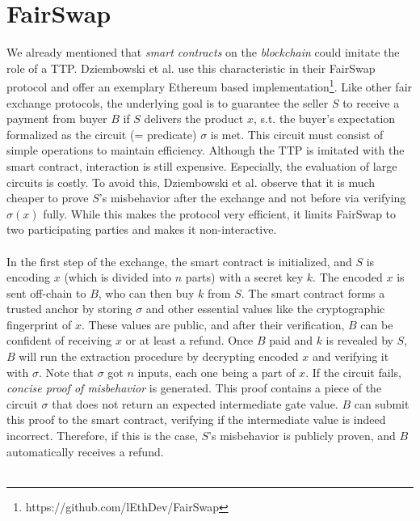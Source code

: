 \documentclass{cacthesis}
\newcounter{protocol}
\begin{document}
        \section{FairSwap}
        \label{sec:FairSwap}
        We already mentioned that \textit{smart contracts} on the \textit{blockchain} could imitate the role of a TTP. Dziembowski et al. use this characteristic in their FairSwap protocol \cite{10.1145/3243734.3243857} and offer an exemplary Ethereum based implementation\footnote{https://github.com/lEthDev/FairSwap}. Like other fair exchange protocols, the underlying goal is to guarantee the seller $S$ to receive a payment from buyer $B$ if $S$ delivers the product $x$, s.t. the buyer's expectation formalized as the circuit (= predicate) $\sigma$ is met. This circuit must consist of simple operations to maintain efficiency. Although the TTP is imitated with the smart contract, interaction is still expensive. Especially, the evaluation of large circuits is costly. To avoid this, Dziembowski et al. observe that it is much cheaper to prove $S$'s misbehavior after the exchange and not before via verifying $\sigma(x)$ fully. While this makes the protocol very efficient, it limits FairSwap to two participating parties and makes it non-interactive. \\\\
        In the first step of the exchange, the smart contract is initialized, and $S$ is encoding $x$ (which is divided into $n$ parts) with a secret key $k$. The encoded $x$ is sent off-chain to $B$, who can then buy $k$ from $S$. The smart contract forms a trusted anchor by storing $\sigma$ and other essential values like the cryptographic fingerprint of $x$. These values are public, and after their verification, $B$ can be confident of receiving $x$ or at least a refund. Once $B$ paid and $k$ is revealed by $S$, $B$ will run the extraction procedure by decrypting encoded $x$ and verifying it with $\sigma$. Note that $\sigma$ got $n$ inputs, each one being a part of $x$. If the circuit fails, \textit{concise proof of misbehavior} is generated. This proof contains a piece of the circuit $\sigma$ that does not return an expected intermediate gate value. $B$ can submit this proof to the smart contract, verifying if the intermediate value is indeed incorrect. Therefore, if this is the case, $S$'s misbehavior is publicly proven, and $B$ automatically receives a refund. \\\\
\end{document}
